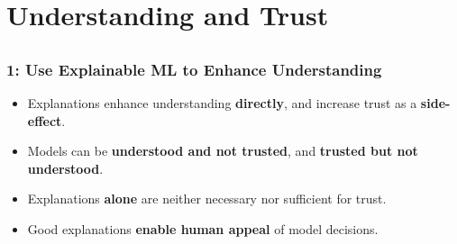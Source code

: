 \documentclass[11pt,aspectratio=169,hyperref={colorlinks}]{beamer}
\begin{document}
	\section{Understanding and Trust}

	\subsection*{} %

	\begin{frame}
	
		\frametitle{1: Use Explainable ML to \textbf{Enhance Understanding}}
		
		\begin{itemize}\Large
			\item{Explanations enhance understanding \textbf{directly}, and increase trust as a \textbf{side-effect}.}
			\vspace{10pt}
			\item{Models can be \textbf{understood and not trusted}, and \textbf{trusted but not understood}.}
			\vspace{10pt}
			\item{Explanations \textbf{alone} are neither necessary nor sufficient for trust.}
			\vspace{10pt}
			\item{Good explanations \textbf{enable human appeal} of model decisions.}
		\end{itemize}
		
	\end{frame}
\end{document}

